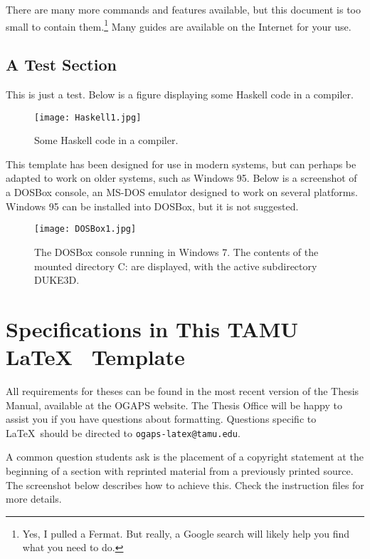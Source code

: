 There are many more commands and features available, but this document is too small to contain them.\footnote{Yes, I pulled a Fermat. But really, a Google search will likely help you find what you need to do.} Many guides are available on the Internet for your use.


\subsection{A Test Section}

This is just a test. Below is a figure displaying some Haskell code in a compiler.

\begin{figure}[!ht]
\centering
	\texttt{[image: Haskell1.jpg]}
	\caption{Some Haskell code in a compiler.}
\end{figure}

This template has been designed for use in modern systems, but can perhaps be adapted to work on older systems, such as Windows 95. Below is a screenshot of a DOSBox console, an MS-DOS emulator designed to work on several platforms. Windows 95 can be installed into DOSBox, but it is not suggested.

\begin{figure}[!ht]
\centering
	\texttt{[image: DOSBox1.jpg]}
	\caption{The DOSBox console running in Windows 7. The contents of the mounted directory C: are displayed, with the active subdirectory DUKE3D.}
\end{figure}

\section{Specifications in This TAMU \LaTeX ~ Template}

All requirements for theses can be found in the most recent version of the Thesis Manual, available at the OGAPS website. The Thesis Office will be happy to assist you if you have questions about formatting. Questions specific to \LaTeX\ should be directed to \texttt{ogaps-latex@tamu.edu}.

A common question students ask is the placement of a copyright statement at the beginning of a section with reprinted material from a previously printed source. The screenshot below describes how to achieve this. Check the instruction files for more details.

